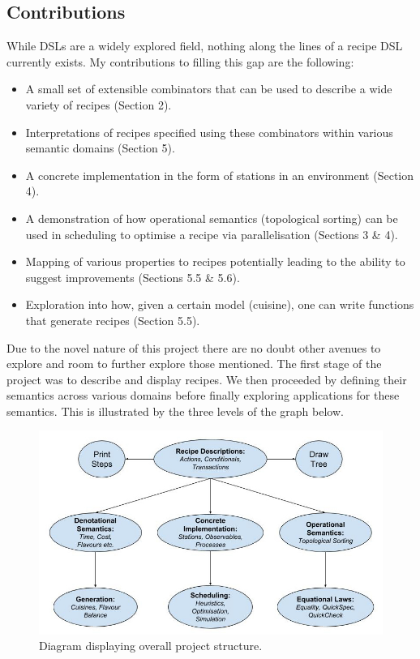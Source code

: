 \documentclass[11pt]{article}
\begin{document}
\subsection{Contributions}

While DSLs are a widely explored field, nothing along the lines of a recipe DSL
currently exists. My contributions to filling this gap are the following:

\begin{itemize}
    \item A small set of extensible combinators that can be used to describe a wide variety of recipes (Section 2).

    \item Interpretations of recipes specified using these combinators within various semantic domains (Section 5).

    \item A concrete implementation in the form of stations in an environment (Section 4).

    \item A demonstration of how operational semantics (topological sorting) can be used in
    scheduling to optimise a recipe via parallelisation (Sections 3 \& 4).

    \item Mapping of various properties to recipes potentially leading to the ability
    to suggest improvements (Sections 5.5 \& 5.6).

    \item Exploration into how, given a certain model (cuisine), one can write functions that
    generate recipes (Section 5.5).
\end{itemize}

Due to the novel nature of this project there are no doubt other avenues to explore and
room to further explore those mentioned. The first stage of the project was to describe
and display recipes. We then proceeded by defining their semantics across various domains
before finally exploring applications for these semantics. This is illustrated by the
three levels of the graph below.

\begin{figure}[h]
\includegraphics[width=\textwidth, keepaspectratio]{project.jpg}
\centering
\caption{Diagram displaying overall project structure.}
\end{figure}
\end{document}
